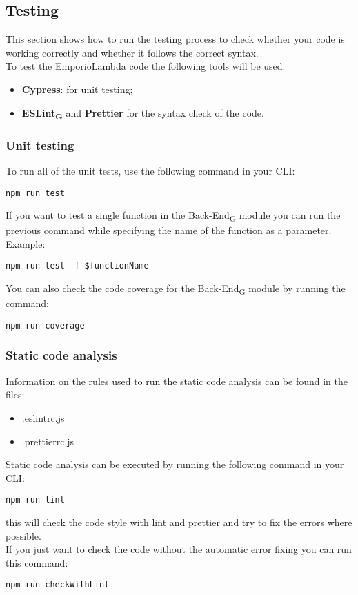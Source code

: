 \subsection{Testing}
This section shows how to run the testing process to check whether your code is working correctly and whether it follows the correct syntax. \\ 
To test the EmporioLambda code the following tools will be used:
\begin{itemize}
\item \textbf{Cypress}: for unit testing;
\item \textbf{ESLint\textsubscript{G}} and \textbf{Prettier} for the syntax check of the code.
\end{itemize}

\subsubsection{Unit testing}
To run all of the unit tests, use the following command in your CLI:
\begin{center}
\texttt{npm run test}
\end{center}
If you want to test a single function in the Back-End\textsubscript{G} module you can run the previous command while specifying the name of the function as a parameter.\\
Example:
\begin{center}
\texttt{npm run test -f \$functionName}
\end{center}
You can also check the code coverage for the Back-End\textsubscript{G} module by running the command:
\begin{center}
\texttt{npm run coverage}
\end{center}

\subsubsection{Static code analysis}
Information on the rules used to run the static code analysis can be found in the files:
\begin{itemize}
\item .eslintrc.js
\item .prettierrc.js
\end{itemize}
Static code analysis can be executed by running the following command in your CLI:
\begin{center}
\texttt{npm run lint}
\end{center}
this will check the code style with lint and prettier and try to fix the errors where possible.\\ 
If you just want to check the code without the automatic error fixing you can run this command:
\begin{center}
\texttt{npm run checkWithLint}
\end{center}